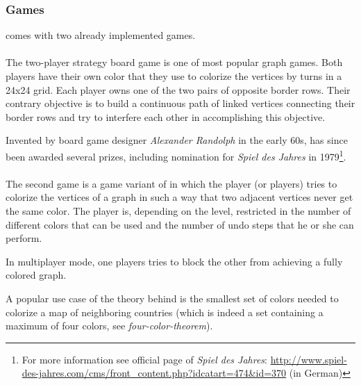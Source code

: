 \subsubsection{Games}
{\graphioli} comes with two already implemented games.\par
\paragraph*{\twixt}
The two-player strategy board game {\twixt} is one of most popular graph games. Both players have their own color that they use to colorize the vertices by turns in a 24x24 grid. Each player owns one of the two pairs of opposite border rows. Their contrary objective is to build a continuous \gls{path} of linked vertices connecting their border rows and try to interfere each other in accomplishing this objective.\par
Invented by board game designer \emph{Alexander Randolph} in the early 60s, {\twixt} has since been awarded several prizes, including nomination for \emph{Spiel des Jahres} in 1979\footnote{For more information see official page of \emph{Spiel des Jahres}: \url{http://www.spiel-des-jahres.com/cms/front_content.php?idcatart=474&id=370} (in German)}.\par
\paragraph*{\graphcoloring}
The second game is a game variant of {\graphcoloring} in which the player (or players) tries to colorize the vertices of a graph in such a way that two \gls{adjacent} vertices never get the same color. The player is, depending on the level, restricted in the number of different colors that can be used and the number of \gls{undo} steps that he or she can perform.\par
In multiplayer mode, one players tries to block the other from achieving a fully colored graph.\par
A popular use case of the theory behind {\graphcoloring} is the smallest set of colors needed to colorize a map of neighboring countries (which is indeed a set containing a maximum of four colors, see \emph{\gls{four-color-theorem}}).\par